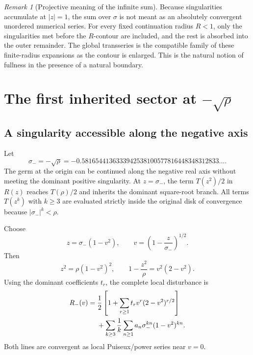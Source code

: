 \documentclass[11pt,a4paper,oneside,openany]{book}
\theoremstyle{definition}
\theoremstyle{remark}
\newtheorem{remark}[theorem]{Remark}
\begin{document}
\begin{remark}[Projective meaning of the infinite sum]
Because singularities accumulate at $|z|=1$, the sum over $\sigma$ is not meant
as an absolutely convergent unordered numerical series.  For every fixed
continuation radius $R<1$, only the singularities met before the $R$-contour are
included, and the rest is absorbed into the outer remainder.  The global
transseries is the compatible family of these finite-radius expansions as the
contour is enlarged.  This is the natural notion of fullness in the presence of
a natural boundary.
\end{remark}

\chapter{The first inherited sector at \texorpdfstring{$-\sqrt\rho$}{-sqrt(rho)}}
\label{ch:negative-sector}

\section{A singularity accessible along the negative axis}
Let
\begin{equation}
 \sigma_-=-\sqrt\rho
 =-0.5816544136333942538100577816448348312833\ldots .
 \label{eq:sigma-minus}
\end{equation}
The germ at the origin can be continued along the negative real axis without
meeting the dominant positive singularity.  At $z=\sigma_-$, the term
$T(z^2)/2$ in $R(z)$ reaches $T(\rho)/2$ and inherits the dominant square-root
branch.  All terms $T(z^k)$ with $k\ge3$ are evaluated strictly inside the
original disk of convergence because $|\sigma_-|^k<\rho$.

Choose
\begin{equation}
 z=\sigma_-(1-v^2),
 \qquad v=\left(1-\frac z{\sigma_-}\right)^{1/2}.
 \label{eq:v-minus}
\end{equation}
Then
\[
 z^2=\rho(1-v^2)^2,
 \qquad
 1-\frac{z^2}{\rho}=v^2(2-v^2).
\]
Using the dominant coefficients $t_r$, the complete local disturbance is
\begin{align}
 R_-(v)={}&\frac12\left[
 1+\sum_{r\ge1}t_rv^r(2-v^2)^{r/2}\right]\notag\\
 &+\sum_{k\ge3}\frac1k\sum_{n\ge1}
 a_n\sigma_-^{kn}(1-v^2)^{kn}.
 \label{eq:Rminus-exact}
\end{align}
Both lines are convergent as local Puiseux/power series near $v=0$.
\end{document}
